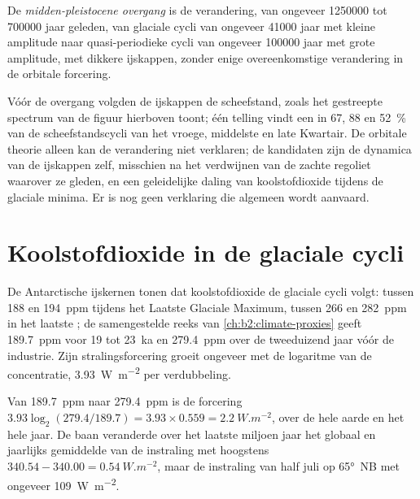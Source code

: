 \begin{definition}\label{def:b2:orbital-forcing:mpt}
De \emph{midden-pleistocene overgang} is de verandering, van ongeveer
\num{1250000} tot \num{700000} jaar geleden, van glaciale cycli van ongeveer \num{41000} jaar met kleine
amplitude naar quasi-periodieke cycli van ongeveer \num{100000} jaar met grote amplitude, met dikkere
ijskappen, zonder enige overeenkomstige verandering in de orbitale forcering.
\end{definition}

Vóór de overgang volgden de ijskappen de scheefstand, zoals het gestreepte spectrum van de figuur
hierboven toont; één telling vindt een  in 67, 88 en \qty{52}{\percent} van de
scheefstandscycli van het vroege, middelste en late Kwartair. De orbitale theorie alleen kan de verandering niet verklaren; de kandidaten zijn de dynamica
van de ijskappen zelf, misschien na het verdwijnen van de zachte regoliet waarover ze gleden,
en een geleidelijke daling van koolstofdioxide tijdens de glaciale minima. Er is nog geen verklaring
die algemeen wordt aanvaard.

\section{Koolstofdioxide in de glaciale cycli}\label{sec:b2:orbital-forcing:co2}

De Antarctische ijskernen tonen dat koolstofdioxide de glaciale cycli volgt: tussen 188 en
\qty{194}{ppm} tijdens het Laatste Glaciale Maximum, tussen 266 en \qty{282}{ppm} in het laatste ;
de samengestelde reeks van \cref{ch:b2:climate-proxies} geeft \qty{189.7}{ppm} voor 19 tot
\qty{23}{ka} en \qty{279.4}{ppm} over de tweeduizend jaar vóór de industrie. Zijn stralingsforcering
groeit ongeveer met de logaritme van de concentratie, \qty{3.93}{W.m^{-2}} per verdubbeling.

\begin{example}\label{ex:b2:orbital-forcing:co2}
Van \qty{189.7}{ppm} naar \qty{279.4}{ppm} is de forcering $3.93\log_2(279.4/189.7) = 3.93 \times
0.559 = \qty{2.2}{W.m^{-2}}$, over de hele aarde en het hele jaar. De baan veranderde over het laatste
miljoen jaar het globaal en jaarlijks gemiddelde van de instraling met hoogstens $340.54 - 340.00 =
\qty{0.54}{W.m^{-2}}$, maar de instraling van half juli op \ang{65}~NB met ongeveer \qty{109}{W.m^{-2}}.
\end{example}

